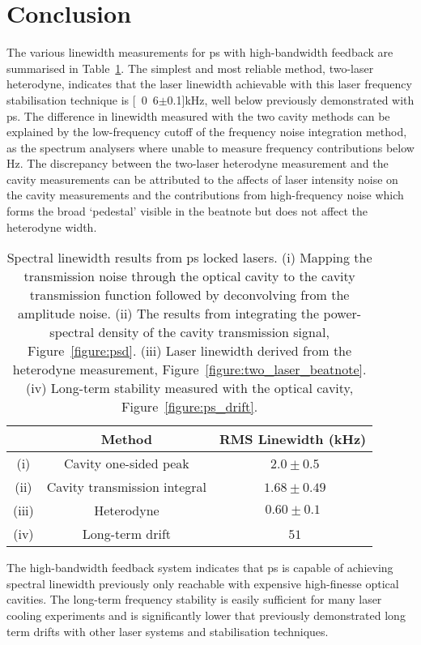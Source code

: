 \section{Conclusion}

The various linewidth measurements for \gls{ps} with high-bandwidth feedback are summarised in Table~\ref{table:linewidths}.
The simplest and most reliable method, two-laser heterodyne, indicates that the laser linewidth achievable with this laser frequency stabilisation technique is \unit[0.6$\pm$0.1]{kHz}, well below previously demonstrated with \gls{ps}.
The difference in linewidth measured with the two cavity methods can be explained by the low-frequency cutoff of the frequency noise integration method, as the spectrum analysers where unable to measure frequency contributions below \unit[24]{Hz}.
The discrepancy between the two-laser heterodyne measurement and the cavity measurements can be attributed to the affects of laser intensity noise on the cavity measurements and the contributions from high-frequency noise which forms the broad `pedestal' visible in the beatnote but does not affect the heterodyne width.

\begin{table}
\centering
\begin{tabular}{c c c}
\\
\hline
  & Method & RMS Linewidth (kHz) \\ \hline
  (i) & Cavity one-sided peak & \,\,$2.0 \pm 0.5$ \\
  (ii) & Cavity transmission integral & \,\,$1.68 \pm 0.49$ \\
  (iii) & Heterodyne & $0.60\pm0.1$ \\
  (iv) & Long-term drift & \,\,$51$ \\ \hline\end{tabular}

\caption{Spectral linewidth results from \gls{ps} locked lasers.
(i) Mapping the transmission noise through the optical cavity to the cavity transmission function followed by deconvolving from the amplitude noise.
(ii) The results from integrating the power-spectral density of the cavity transmission signal, Figure~\ref{figure:psd}.
(iii) Laser linewidth derived from the heterodyne measurement, Figure~\ref{figure:two_laser_beatnote}.
(iv) Long-term stability measured with the optical cavity, Figure~\ref{figure:ps_drift}.}
\label{table:linewidths}
\end{table}

The high-bandwidth feedback system indicates that \gls{ps} is capable of achieving spectral linewidth previously only reachable with expensive high-finesse optical cavities.
The long-term frequency stability is easily sufficient for many laser cooling experiments and is significantly lower that previously demonstrated long term drifts with other laser systems and stabilisation techniques.


